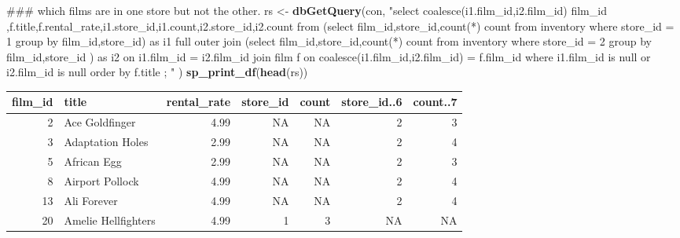 \documentclass[]{book}
\newenvironment{Shaded}{\begin{snugshade}}{\end{snugshade}}
\newcommand{\KeywordTok}[1]{\textcolor[rgb]{0.13,0.29,0.53}{\textbf{#1}}}
\newcommand{\NormalTok}[1]{#1}
\newcommand{\StringTok}[1]{\textcolor[rgb]{0.31,0.60,0.02}{#1}}
\theoremstyle{definition}
\theoremstyle{definition}
\theoremstyle{definition}
\theoremstyle{remark}
\begin{document}
\begin{Shaded}
\begin{Highlighting}[]
\NormalTok{### which films are in one store but not the other.}
\NormalTok{rs <-}\StringTok{ }\KeywordTok{dbGetQuery}\NormalTok{(con,}
                \StringTok{"select coalesce(i1.film_id,i2.film_id) film_id}
\StringTok{                       ,f.title,f.rental_rate,i1.store_id,i1.count,i2.store_id,i2.count}
\StringTok{                   from     (select film_id,store_id,count(*) count }
\StringTok{                               from inventory where store_id = 1 }
\StringTok{                             group by film_id,store_id) as i1}
\StringTok{                         full outer join }
\StringTok{                            (select film_id,store_id,count(*) count}
\StringTok{                               from inventory where store_id = 2 }
\StringTok{                             group by film_id,store_id}
\StringTok{                            ) as i2}
\StringTok{                           on i1.film_id = i2.film_id }
\StringTok{                         join film f }
\StringTok{                           on coalesce(i1.film_id,i2.film_id) = f.film_id}
\StringTok{                  where i1.film_id is null or i2.film_id is null }
\StringTok{                 order by f.title  ;}
\StringTok{               "}
\NormalTok{                )  }
\KeywordTok{sp_print_df}\NormalTok{(}\KeywordTok{head}\NormalTok{(rs))}
\end{Highlighting}
\end{Shaded}

\begin{tabular}{r|l|r|r|r|r|r}
\hline
film\_id & title & rental\_rate & store\_id & count & store\_id..6 & count..7\\
\hline
2 & Ace Goldfinger & 4.99 & NA & NA & 2 & 3\\
\hline
3 & Adaptation Holes & 2.99 & NA & NA & 2 & 4\\
\hline
5 & African Egg & 2.99 & NA & NA & 2 & 3\\
\hline
8 & Airport Pollock & 4.99 & NA & NA & 2 & 4\\
\hline
13 & Ali Forever & 4.99 & NA & NA & 2 & 4\\
\hline
20 & Amelie Hellfighters & 4.99 & 1 & 3 & NA & NA\\
\hline
\end{tabular}
\end{document}
